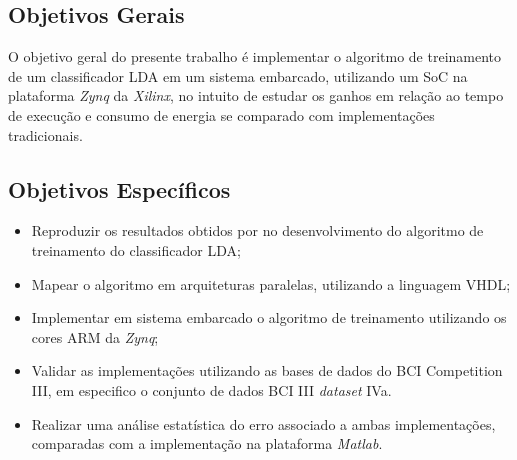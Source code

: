 \subsection{Objetivos Gerais}

	O objetivo geral do presente trabalho é implementar o algoritmo de treinamento de um classificador LDA em um sistema embarcado, utilizando um SoC na plataforma \textit{Zynq} da \textit{Xilinx}, no intuito de estudar os ganhos em relação ao tempo de execução e consumo de energia se comparado com implementações tradicionais.

\subsection{Objetivos Específicos}

\begin{itemize}
	\item Reproduzir os resultados obtidos por \cite{F.Lotte} no desenvolvimento do algoritmo de treinamento do classificador LDA;
	\item Mapear o algoritmo em arquiteturas paralelas, utilizando a linguagem VHDL;
	\item Implementar em sistema embarcado o algoritmo de treinamento utilizando os cores ARM da \textit{Zynq};
	\item Validar as implementações utilizando as bases de dados do BCI Competition III, em especifico o conjunto de dados BCI III \textit{dataset} IVa.
	\item Realizar uma análise estatística do erro associado a ambas implementações, comparadas com a implementação na plataforma \textit{Matlab}.
\end{itemize}
